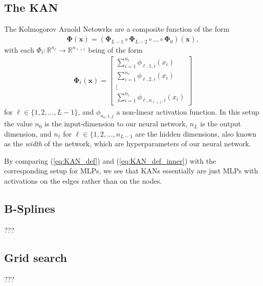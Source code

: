 \documentclass{article}
\begin{document}
\subsection{The KAN}
The Kolmogorov Arnold Netowrks are a composite function of the form
\begin{align}
    \mathbf{\Phi}(\mathbf{x}) = (\mathbf{\Phi}_{L-1} \circ \mathbf{\Phi}_{L-2} \circ \dots \circ \mathbf{\Phi}_{0})(\mathbf{x}), \label{eq:KAN_def}
\end{align}
with each $\Phi_{\ell} : \mathbb{R}^{n_{\ell}} \to \mathbb{R}^{n_{\ell + 1}}$ being of the form
\begin{align}
    \mathbf{\Phi}_{\ell}(\mathbf{x}) = \begin{bmatrix}
        \sum_{i=1}^{n_{\ell}} \phi_{\ell, 1, i}(x_{i}) \\
        \sum_{i=1}^{n_{\ell}} \phi_{\ell, 2, i}(x_{i}) \\
        \vdots \\
        \sum_{i=1}^{n_{\ell}} \phi_{\ell, n_{\ell + 1}, i}(x_{i}) 
    \end{bmatrix} \label{eq:KAN_def_inner}
\end{align}
for $\ell \in \lbrace 1, 2, \dots, L-1 \rbrace$, and $\phi_{n_{\ell}, i, j}$ a non-linear activation function. In this setup the value 
$n_0$ is the input-dimension to our neural network, $n_L$ is the output dimension, and $n_{\ell}$ for $\ell \in \lbrace 1,2, \dots, n_{L-1}$ 
are the hidden dimensions, also known as the \emph{width} of the network, which are hyperparameters of our neural network.

By comparing (\ref{eq:KAN_def}) and (\ref{eq:KAN_def_inner}) with the corresponding setup for MLPs, 
we see that KANs essentially are just MLPs with activations on the edges rather than on the nodes.



\subsection{B-Splines} \label{sec:b_spline}
???

\subsection{Grid search}
???
\end{document}

